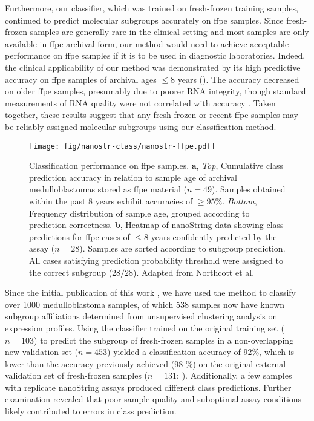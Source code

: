 Furthermore, our classifier, which was trained on fresh-frozen training samples, continued to predict molecular subgroups accurately on \gls{ffpe} samples. Since fresh-frozen samples are generally rare in the clinical setting and most samples are only available in \gls{ffpe} archival form, our method would need to achieve acceptable performance on \gls{ffpe} samples if it is to be used in diagnostic laboratories. Indeed, the clinical applicability of our method was demonstrated by its high predictive accuracy on \gls{ffpe} samples of archival ages $\leq 8$ years (). The accuracy decreased on older \gls{ffpe} samples, presumably due to poorer RNA integrity, though standard measurements of RNA quality were not correlated with accuracy . Taken together, these results suggest that any fresh frozen or recent \gls{ffpe} samples may be reliably assigned molecular subgroups using our classification method.

\begin{figure}[ht]
	\begin{center}
		\texttt{[image: fig/nanostr-class/nanostr-ffpe.pdf]}
	\end{center}
	\caption[Classification performance on formalin-fixed paraffin embedded archival samples]
	{
	Classification performance on \gls{ffpe} samples.
	\textbf{a}, \emph{Top}, Cumulative class prediction accuracy in relation to sample age of archival medulloblastomas stored as \gls{ffpe} material ($n = 49$). Samples obtained within the past 8 years exhibit accuracies of $\geq 95\%$. \emph{Bottom}, Frequency distribution of sample age, grouped according to prediction correctness.
	\textbf{b}, Heatmap of nanoString data showing class predictions for \gls{ffpe} cases of $\leq 8$ years confidently predicted by the assay ($n = 28$). Samples are sorted according to subgroup prediction. All cases satisfying prediction probability threshold were assigned to the correct subgroup ($28/28$). Adapted from Northcott et al.
	}
	\label{fig:nanostr-ffpe}
\end{figure}

Since the initial publication of this work , we have used the method to classify over 1000 medulloblastoma samples, of which 538 samples now have known subgroup affiliations determined from unsupervised clustering analysis on expression profiles. Using the classifier trained on the original training set ($n = 103$) to predict the subgroup of fresh-frozen samples in a non-overlapping new validation set ($n = 453$) yielded a classification accuracy of 92\%, which is lower than the accuracy previously achieved (98 \%) on the original external validation set of fresh-frozen samples ($n = 131$; ). Additionally, a few samples with replicate nanoString assays produced different class predictions. Further examination revealed that poor sample quality and suboptimal assay conditions likely contributed to errors in class prediction.


